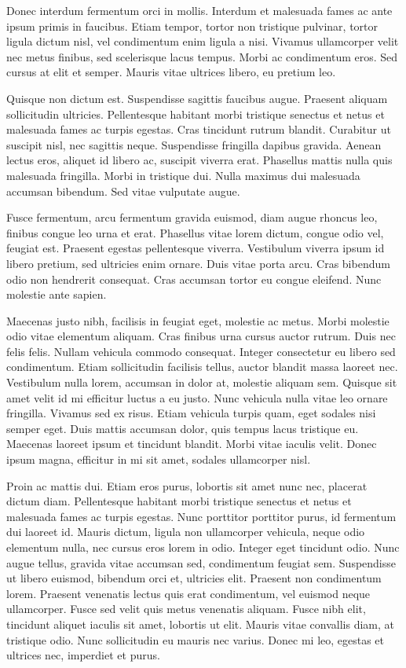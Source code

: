 \documentclass[12pt, letterpaper,twocolumn]{article}
\begin{document}
Donec interdum fermentum orci in mollis. Interdum et malesuada fames ac ante ipsum primis in faucibus. Etiam tempor, tortor non tristique pulvinar, tortor ligula dictum nisl, vel condimentum enim ligula a nisi. Vivamus ullamcorper velit nec metus finibus, sed scelerisque lacus tempus. Morbi ac condimentum eros. Sed cursus at elit et semper. Mauris vitae ultrices libero, eu pretium leo.

Quisque non dictum est. Suspendisse sagittis faucibus augue. Praesent aliquam sollicitudin ultricies. Pellentesque habitant morbi tristique senectus et netus et malesuada fames ac turpis egestas. Cras tincidunt rutrum blandit. Curabitur ut suscipit nisl, nec sagittis neque. Suspendisse fringilla dapibus gravida. Aenean lectus eros, aliquet id libero ac, suscipit viverra erat. Phasellus mattis nulla quis malesuada fringilla. Morbi in tristique dui. Nulla maximus dui malesuada accumsan bibendum. Sed vitae vulputate augue.

Fusce fermentum, arcu fermentum gravida euismod, diam augue rhoncus leo, finibus congue leo urna et erat. Phasellus vitae lorem dictum, congue odio vel, feugiat est. Praesent egestas pellentesque viverra. Vestibulum viverra ipsum id libero pretium, sed ultricies enim ornare. Duis vitae porta arcu. Cras bibendum odio non hendrerit consequat. Cras accumsan tortor eu congue eleifend. Nunc molestie ante sapien.

Maecenas justo nibh, facilisis in feugiat eget, molestie ac metus. Morbi molestie odio vitae elementum aliquam. Cras finibus urna cursus auctor rutrum. Duis nec felis felis. Nullam vehicula commodo consequat. Integer consectetur eu libero sed condimentum. Etiam sollicitudin facilisis tellus, auctor blandit massa laoreet nec. Vestibulum nulla lorem, accumsan in dolor at, molestie aliquam sem. Quisque sit amet velit id mi efficitur luctus a eu justo. Nunc vehicula nulla vitae leo ornare fringilla. Vivamus sed ex risus. Etiam vehicula turpis quam, eget sodales nisi semper eget. Duis mattis accumsan dolor, quis tempus lacus tristique eu. Maecenas laoreet ipsum et tincidunt blandit. Morbi vitae iaculis velit. Donec ipsum magna, efficitur in mi sit amet, sodales ullamcorper nisl.

Proin ac mattis dui. Etiam eros purus, lobortis sit amet nunc nec, placerat dictum diam. Pellentesque habitant morbi tristique senectus et netus et malesuada fames ac turpis egestas. Nunc porttitor porttitor purus, id fermentum dui laoreet id. Mauris dictum, ligula non ullamcorper vehicula, neque odio elementum nulla, nec cursus eros lorem in odio. Integer eget tincidunt odio. Nunc augue tellus, gravida vitae accumsan sed, condimentum feugiat sem. Suspendisse ut libero euismod, bibendum orci et, ultricies elit. Praesent non condimentum lorem. Praesent venenatis lectus quis erat condimentum, vel euismod neque ullamcorper. Fusce sed velit quis metus venenatis aliquam. Fusce nibh elit, tincidunt aliquet iaculis sit amet, lobortis ut elit. Mauris vitae convallis diam, at tristique odio. Nunc sollicitudin eu mauris nec varius. Donec mi leo, egestas et ultrices nec, imperdiet et purus.
\end{document}
